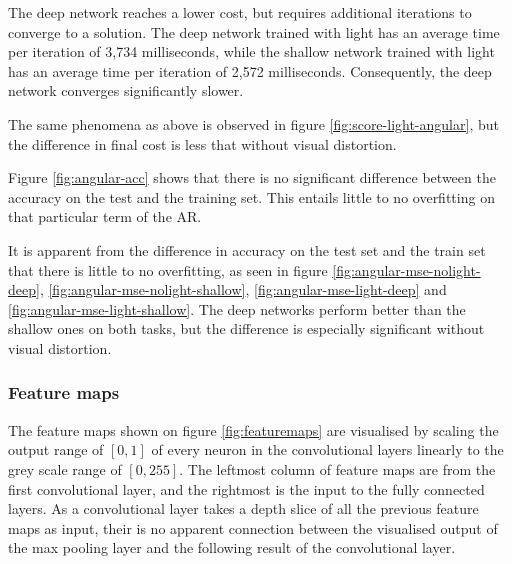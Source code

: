 

\noindent
The deep network reaches a lower cost, but requires additional iterations to converge to a solution. The deep network trained with light has an average time per iteration of 3,734 milliseconds, while the shallow network trained with light has an average time per iteration of 2,572 milliseconds. Consequently, the deep network converges significantly slower.



\noindent
The same phenomena as above is observed in figure \ref{fig:score-light-angular}, but the difference in final cost is less that without visual distortion.


\noindent
Figure \ref{fig:angular-acc} shows that there is no significant difference between the accuracy on the test and the training set. This entails little to no overfitting on that particular term of the AR.


It is apparent from the difference in accuracy on the test set and the train set that there is little to no overfitting, as seen in figure \ref{fig:angular-mse-nolight-deep}, \ref{fig:angular-mse-nolight-shallow}, \ref{fig:angular-mse-light-deep} and \ref{fig:angular-mse-light-shallow}. The deep networks perform better than the shallow ones on both tasks, but the difference is especially significant without visual distortion.





\subsubsection{Feature maps}
The feature maps shown on figure \ref{fig:featuremaps} are visualised by scaling the output range of $[0,1]$ of every neuron in the convolutional layers linearly to the grey scale range of $[0,255]$. The leftmost column of feature maps are from the first convolutional layer, and the rightmost is the input to the fully connected layers. As a convolutional layer takes a depth slice of all the previous feature maps as input, their is no apparent connection between the visualised output of the max pooling layer and the following result of the convolutional layer.

